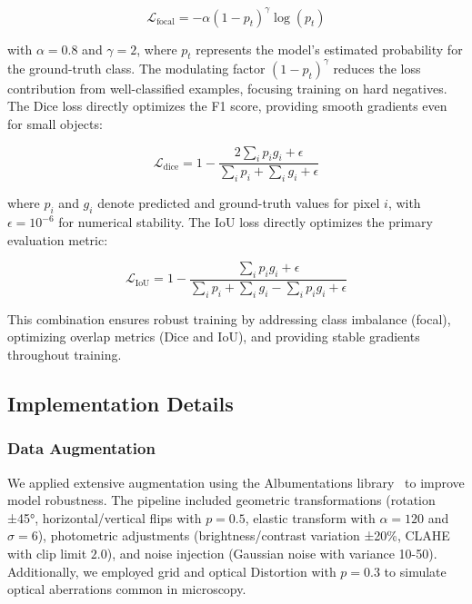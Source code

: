 \documentclass[preprint,12pt]{elsarticle}
\begin{document}
\begin{equation}
\mathcal{L}_{\text{focal}} = -\alpha(1-p_t)^\gamma \log(p_t)
\end{equation}

with $\alpha = 0.8$ and $\gamma = 2$, where $p_t$ represents the model's estimated probability for the ground-truth class. The modulating factor $(1-p_t)^\gamma$ reduces the loss contribution from well-classified examples, focusing training on hard negatives. The Dice loss directly optimizes the F1 score, providing smooth gradients even for small objects:

\begin{equation}
\mathcal{L}_{\text{dice}} = 1 - \frac{2\sum_{i} p_i g_i + \epsilon}{\sum_{i} p_i + \sum_{i} g_i + \epsilon}
\end{equation}

where $p_i$ and $g_i$ denote predicted and ground-truth values for pixel $i$, with $\epsilon = 10^{-6}$ for numerical stability. The IoU loss directly optimizes the primary evaluation metric:

\begin{equation}
\mathcal{L}_{\text{IoU}} = 1 - \frac{\sum_{i} p_i g_i + \epsilon}{\sum_{i} p_i + \sum_{i} g_i - \sum_{i} p_i g_i + \epsilon}
\end{equation}

This combination ensures robust training by addressing class imbalance (focal), optimizing overlap metrics (Dice and IoU), and providing stable gradients throughout training.

\subsection{Implementation Details}
\label{subsec:implementation}

\subsubsection{Data Augmentation}
We applied extensive augmentation using the Albumentations library~\cite{buslaev2020albumentations} to improve model robustness. The pipeline included geometric transformations (rotation ±45°, horizontal/vertical flips with $p=0.5$, elastic transform with $\alpha=120$ and $\sigma=6$), photometric adjustments (brightness/contrast variation ±20\%, CLAHE~\cite{clahe1994} with clip limit $2.0$), and noise injection (Gaussian noise with variance 10-50). Additionally, we employed grid and optical Distortion with $p=0.3$ to simulate optical aberrations common in microscopy.
\end{document}
